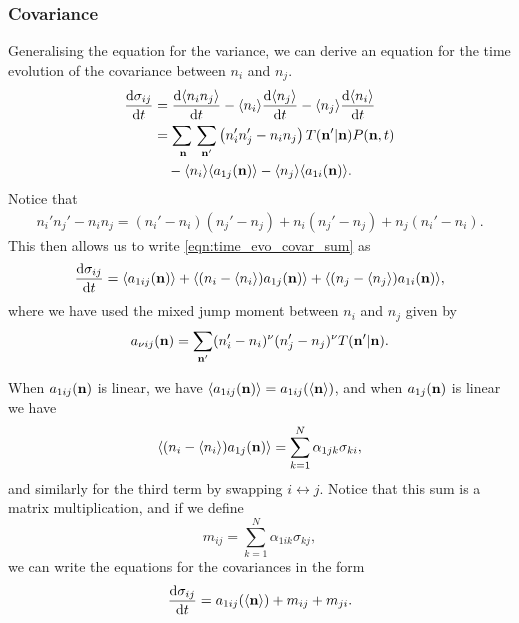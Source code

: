\subsubsection{Covariance}
Generalising the equation for the variance, we can derive an equation for the
time evolution of the covariance between \(n_i\) and \(n_j\).
\begin{equation}
    \begin{aligned}
        \diff{\sigma_{ij}}{t}
        &= \diff{\E{n_i n_j}}{t} - \E{n_i}\diff{\E{n_j}}{t} -
        \E{n_j}\diff{\E{n_i}}{t}\\
        &= \adjustlimits\sum_{\V{n}} \sum_{\V{n}'}\left(n_i' n_j' - n_i
        n_j\right)T(\V{n}' | \V{n})P(\V{n},t)\\
        & \quad - \E{n_i}\E{a_{1j}(\V{n})} - \E{n_j}\E{a_{1i}(\V{n})}.
    \end{aligned}
    \label{eqn:time_evo_covar_sum}
\end{equation}
Notice that
\begin{align*}
    n_i' n_j' - n_i n_j = (n_i' - n_i)(n_j' - n_j) + n_i(n_j' - n_j) + n_j(n_i'
    - n_i).
\end{align*}
This then allows us to write \eqref{eqn:time_evo_covar_sum} as
\begin{equation}
    \begin{aligned}
        \frac{\mathrm{d} \sigma_{ij}}{\mathrm{d} t} = \langle a_{1 i j}(\mathbf{n}) \rangle +
        \langle (n_i - \langle n_i \rangle)a_{1j}(\mathbf{n}) \rangle + \langle (n_j - \langle n_j \rangle)a_{1i}(\mathbf{n}) \rangle,
    \end{aligned}
    \label{eqn:time_evo_covar_jump_moments}
\end{equation}
where we have used the mixed jump moment between \(n_i\) and \(n_j\) given by
\begin{equation}
    a_{\nu i j}(\mathbf{n}) = \sum_{\mathbf{n}'} (n_i' - n_i)^\nu (n_j' - n_j)^\nu
    T(\mathbf{n}' | \mathbf{n}).
    \label{eqn:mixed_jump_moment_i_j}
\end{equation}

When \(a_{1ij}(\mathbf{n})\) is linear, we have \(\langle a_{1ij}(\mathbf{n}) \rangle =
a_{1ij}(\langle \mathbf{n} \rangle)\), and when \(a_{1j}(\mathbf{n})\) is linear we have
\begin{equation*}
    \langle (n_i - \langle n_i \rangle)a_{1j}(\mathbf{n}) \rangle = \sum_{k=1}^N \alpha_{1jk} \sigma_{ki},
\end{equation*}
and similarly for the third term by swapping \(i \leftrightarrow j\). Notice
that this sum is a matrix multiplication, and if we define
\begin{equation}
    m_{ij} = \sum_{k=1}^N \alpha_{1ik}\sigma_{kj},
\end{equation}
we can write the equations for the covariances in the form
\begin{equation}
    \begin{aligned}
        \frac{\mathrm{d} \sigma_{ij}}{\mathrm{d} t} = a_{1 i j}(\langle \mathbf{n} \rangle) + m_{ij} + m_{ji}.
    \end{aligned}
    \label{eqn:time_evo_covar_linear_jump_moments}
\end{equation}

